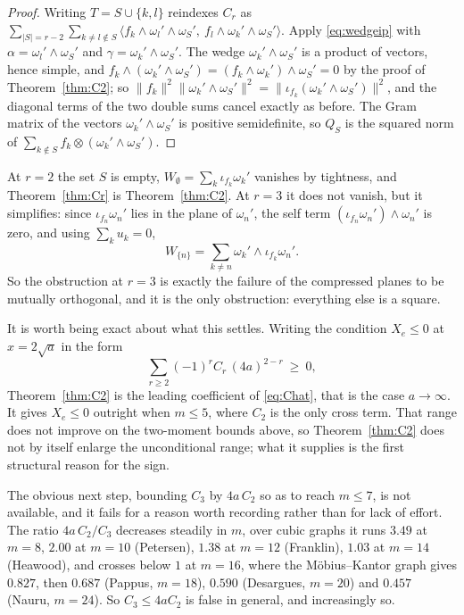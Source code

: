 \documentclass[11pt]{article}
\theoremstyle{remark}
\begin{document}
\begin{proof}
Writing $T=S\cup\{k,l\}$ reindexes $C_r$ as
$\sum_{|S|=r-2}\sum_{k\ne l\notin S}\langle f_k\wedge\omega_l'\wedge\omega_S',\
f_l\wedge\omega_k'\wedge\omega_S'\rangle$. Apply \eqref{eq:wedgeip} with
$\alpha=\omega_l'\wedge\omega_S'$ and $\gamma=\omega_k'\wedge\omega_S'$. The wedge
$\omega_k'\wedge\omega_S'$ is a product of vectors, hence simple, and
$f_k\wedge(\omega_k'\wedge\omega_S')=(f_k\wedge\omega_k')\wedge\omega_S'=0$ by the proof
of Theorem~\ref{thm:C2}; so
$\|f_k\|^2\|\omega_k'\wedge\omega_S'\|^2=\|\iota_{f_k}(\omega_k'\wedge\omega_S')\|^2$,
and the diagonal terms of the two double sums cancel exactly as before. The Gram matrix
of the vectors $\omega_k'\wedge\omega_S'$ is positive semidefinite, so $Q_S$ is the
squared norm of $\sum_{k\notin S}f_k\otimes(\omega_k'\wedge\omega_S')$.
\end{proof}

At $r=2$ the set $S$ is empty, $W_\emptyset=\sum_k\iota_{f_k}\omega_k'$ vanishes by
tightness, and Theorem~\ref{thm:Cr} is Theorem~\ref{thm:C2}. At $r=3$ it does not
vanish, but it simplifies: since $\iota_{f_n}\omega_n'$ lies in the plane of $\omega_n'$,
the self term $(\iota_{f_n}\omega_n')\wedge\omega_n'$ is zero, and using
$\sum_ku_k=0$,
\[
W_{\{n\}}=\sum_{k\ne n}\omega_k'\wedge\iota_{f_k}\omega_n' .
\]
So the obstruction at $r=3$ is exactly the failure of the compressed planes to be
mutually orthogonal, and it is the only obstruction: everything else is a square.

It is worth being exact about what this settles. Writing the condition $X_e\le0$ at
$x=2\sqrt a$ in the form
\begin{equation}\label{eq:Chat}
\sum_{r\ge2}(-1)^rC_r\,(4a)^{2-r}\ \ge\ 0 ,
\end{equation}
Theorem~\ref{thm:C2} is the leading coefficient of \eqref{eq:Chat}, that is the case
$a\to\infty$. It gives $X_e\le0$ outright when $m\le5$, where $C_2$ is the only cross
term. That range does not improve on the two-moment bounds above, so
Theorem~\ref{thm:C2} does not by itself enlarge the unconditional range; what it supplies
is the first structural reason for the sign.

The obvious next step, bounding $C_3$ by $4a\,C_2$ so as to reach $m\le7$, is not
available, and it fails for a reason worth recording rather than for lack of effort. The
ratio $4a\,C_2/C_3$ decreases steadily in $m$, over cubic graphs it runs $3.49$ at
$m=8$, $2.00$ at $m=10$ (Petersen), $1.38$ at $m=12$ (Franklin), $1.03$ at $m=14$
(Heawood), and crosses below $1$ at $m=16$, where the M\"obius--Kantor graph gives
$0.827$, then $0.687$ (Pappus, $m=18$), $0.590$ (Desargues, $m=20$) and $0.457$ (Nauru,
$m=24$). So $C_3\le4aC_2$ is false in general, and increasingly so.
\end{document}
